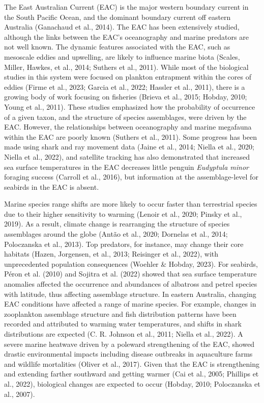 \documentclass{article}
\begin{document}
\begin{linenumbers}
The East Australian Current (EAC) is the major western boundary current in the South Pacific Ocean, and the dominant boundary current off eastern Australia (Ganachaud et al., 2014). The EAC has been extensively studied, although the links between the EAC's oceanography and marine predators are not well known. The dynamic features associated with the EAC, such as mesoscale eddies and upwelling, are likely to influence marine biota (Scales, Miller, Hawkes, et al., 2014; Suthers et al., 2011). While most of the biological studies in this system were focused on plankton entrapment within the cores of eddies (Firme et al., 2023; Garcia et al., 2022; Hassler et al., 2011), there is a growing body of work focusing on fisheries (Brieva et al., 2015; Hobday, 2010; Young et al., 2011). These studies emphasized how the probability of occurrence of a given taxon, and the structure of species assemblages, were driven by the EAC. However, the relationships between oceanography and marine megafauna within the EAC are poorly known (Suthers et al., 2011). Some progress has been made using shark and ray movement data (Jaine et al., 2014; Niella et al., 2020; Niella et al., 2022), and satellite tracking has also demonstrated that increased sea surface temperatures in the EAC decreases little penguin \emph{Eudyptula minor} foraging success (Carroll et al., 2016), but information at the assemblage-level for seabirds in the EAC is absent.

Marine species range shifts are more likely to occur faster than terrestrial species due to their higher sensitivity to warming (Lenoir et al., 2020; Pinsky et al., 2019). As a result, climate change is rearranging the structure of species assemblages around the globe (Antão et al., 2020; Dornelas et al., 2014; Poloczanska et al., 2013). Top predators, for instance, may change their core habitats (Hazen, Jorgensen, et al., 2013; Reisinger et al., 2022), with unprecedented population consequences (Woehler \& Hobday, 2023). For seabirds, Péron et al. (2010) and Sojitra et al. (2022) showed that sea surface temperature anomalies affected the occurrence and abundances of albatross and petrel species with latitude, thus affecting assemblage structure. In eastern Australia, changing EAC conditions have affected a range of marine species. For example, changes in zooplankton assemblage structure and fish distribution patterns have been recorded and attributed to warming water temperatures, and shifts in shark distributions are expected (C. R. Johnson et al., 2011; Niella et al., 2022). A severe marine heatwave driven by a poleward strengthening of the EAC, showed drastic environmental impacts including disease outbreaks in aquaculture farms and wildlife mortalities (Oliver et al., 2017). Given that the EAC is strengthening and extending farther southward and getting warmer (Cai et al., 2005; Phillips et al., 2022), biological changes are expected to occur (Hobday, 2010; Poloczanska et al., 2007).


\end{linenumbers}
\end{document}
